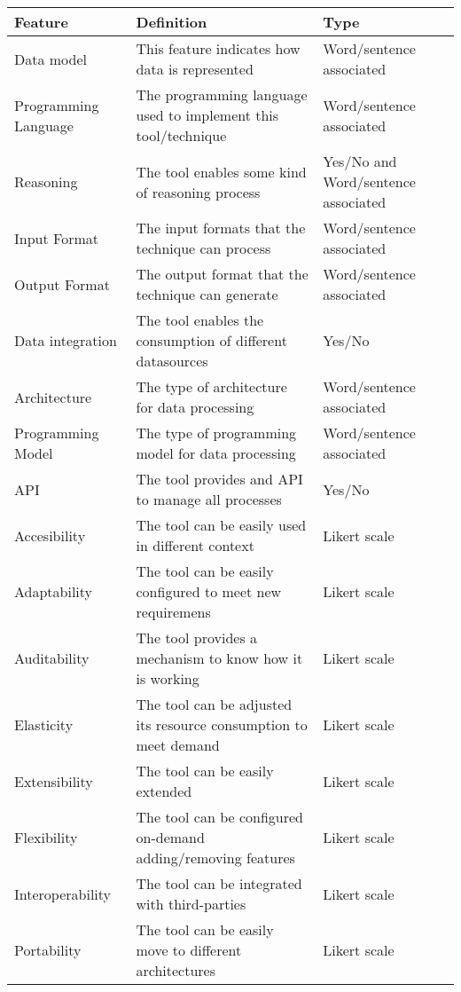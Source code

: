 \begin{table}[!ht]
\renewcommand{\arraystretch}{1.3}
\tiny
\begin{center}
\begin{tabular}[c]{|p{2.5cm}|p{5cm}|p{3cm}|} 
\hline
  \textbf{Feature} &  \textbf{Definition}  &  \textbf{Type} \\\hline
  Data model & This feature indicates how data is represented & Word/sentence associated \\ \hline
  Programming Language & The programming language used to implement this tool/technique & Word/sentence associated \\ \hline
  Reasoning & The tool enables some kind of reasoning process & Yes/No and Word/sentence associated  \\ \hline
  Input Format & The input formats that the technique can process & Word/sentence associated  \\ \hline
  Output Format & The output format that the technique can generate & Word/sentence associated  \\ \hline
  Data integration & The tool enables the consumption of different datasources &  Yes/No \\ \hline
  Architecture & The type of architecture for data processing & Word/sentence associated\\ \hline
  Programming Model & The type of programming model for data processing  & Word/sentence associated\\ \hline
  API & The tool provides and API to manage all processes & Yes/No  \\ \hline
  Accesibility & The tool can be easily used in different context & Likert scale  \\ \hline
  Adaptability & The tool can be easily configured to meet new requiremens & Likert scale  \\ \hline
  Auditability & The tool provides a mechanism to know how it is working & Likert scale  \\ \hline
  Elasticity & The tool can be adjusted its resource consumption to meet demand & Likert scale  \\ \hline
  Extensibility & The tool can be easily extended & Likert scale  \\ \hline
  Flexibility & The tool can be configured on-demand adding/removing features & Likert scale  \\ \hline  
  Interoperability & The tool can be integrated with third-parties  & Likert scale  \\ \hline
  Portability & The tool can be easily move to different architectures & Likert scale  \\ \hline

\end{tabular}
\end{center}
\end{table}
